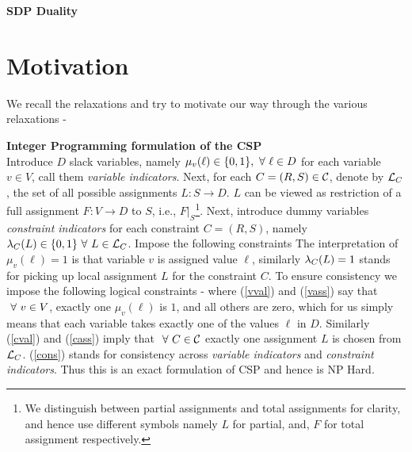 
%

%

\begin{center}
\large \bf SDP Duality
\end{center}

\bigskip

%
%

\section{Motivation}

We recall the relaxations and try to motivate our way through the various relaxations -
\begin{discussion}{\bf Integer Programming formulation of the CSP}\\
Introduce $D$ slack variables, namely $\mu_v(\ell) \in \{ 0, 1 \}, \ \forall \  \ell \in D$ for each variable $v \in V$, call them \textit{variable indicators}. 
Next, for each $C=(R,S)\in \mathcal{C}$, denote by $\mathcal{L}_C$, the set of all possible assignments $L : S \rightarrow D$. 
$L$ can be viewed as restriction of a full assignment $F: V \rightarrow D$ to $S$, i.e., $F|_S$\footnote{We distinguish between partial assignments and total assignments for clarity, and hence use different symbols namely $L$ for partial, and, $F$ for total assignment respectively.}. 
Next, introduce dummy variables \textit{constraint indicators} for each constraint $C=(R,S)$, namely $\lambda_C(L) \in \{ 0, 1\} \ \forall \  L \in \mathcal{L}_C$. 
Impose the following constraints 
The interpretation of $\mu_v(\ell)=1$ is that variable $v$ is assigned value $\ell$, similarly $\lambda_C(L)=1$ stands for picking up local assignment $L$ for the constraint $C$. 
To ensure consistency we impose the following logical constraints -
  where (\ref{vval}) and (\ref{vass}) say that $\ \forall \  v \in V$, exactly one $\mu_v(\ell)$ is $1$, and all others are zero, which for us simply means that each variable takes exactly one of the values $\ell$ in $D$. 
Similarly (\ref{cval}) and (\ref{cass}) imply that $\ \forall \  C \in \mathcal{C}$ exactly one assignment $L$ is chosen from $\mathcal{L}_C$. (\ref{cons}) stands for consistency across \textit{variable indicators} and \textit{constraint indicators}.
Thus this is an exact formulation of CSP and hence is NP Hard. 
\end{discussion}

